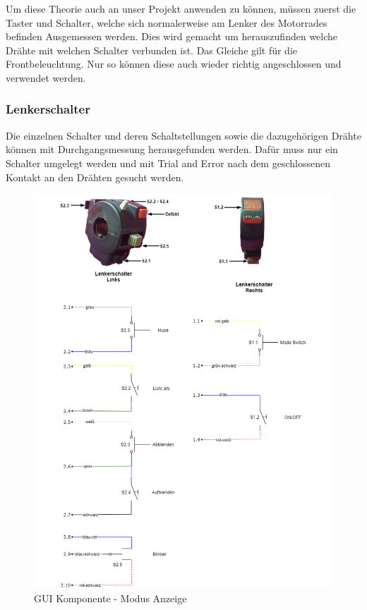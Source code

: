 Um diese Theorie auch an unser Projekt anwenden zu können, müssen zuerst die Taster und Schalter, welche sich normalerweise am Lenker des Motorrades befinden Ausgemessen werden. Dies wird gemacht um herauszufinden welche Drähte mit welchen Schalter verbunden ist. Das Gleiche gilt für die Frontbeleuchtung. Nur so können diese auch wieder richtig angeschlossen und verwendet werden.

\subsubsection{Lenkerschalter}

 Die einzelnen Schalter und deren Schaltstellungen sowie die dazugehörigen Drähte können mit Durchgangsmessung herausgefunden werden. Dafür muss nur ein Schalter umgelegt werden und mit Trial and Error nach dem geschlossenen Kontakt an den Drähten gesucht werden.  

\begin{figure}[H]
	\begin{center}
		\includegraphics[scale=0.6]{figures/hcis/Motorrad-switches.png}
		\caption{GUI Komponente - Modus Anzeige}
		\label{fig:switches}
	\end{center}
\end{figure} 

